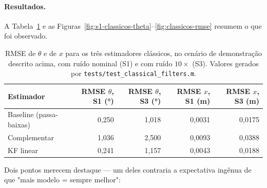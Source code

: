 \documentclass[brazil, 12pt]{article}
\begin{document}
\paragraph{Resultados.} A Tabela~\ref{tab:rmse-classicos} e as
Figuras~\ref{fig:s1-classicos-theta}--\ref{fig:classicos-rmse} resumem o que
foi observado.

\begin{table}[H]
\centering
\small
\begin{tabular}{@{}l r r r r@{}}
\hline
\textbf{Estimador} & \textbf{RMSE $\theta$, S1 (°)} & \textbf{RMSE $\theta$, S3 (°)} & \textbf{RMSE $x$, S1 (m)} & \textbf{RMSE $x$, S3 (m)} \\
\hline
Baseline (passa-baixas) & 0,250 & 1,018 & 0,0031 & 0,0175 \\
Complementar             & 1,036 & 2,500 & 0,0093 & 0,0388 \\
KF linear                & 0,241 & 1,157 & 0,0043 & 0,0188 \\
\hline
\end{tabular}
\caption{RMSE de $\theta$ e de $x$ para os três estimadores clássicos, no
cenário de demonstração descrito acima, com ruído nominal (S1) e com
ruído $10\times$ (S3). Valores gerados por
\texttt{tests/test\_classical\_filters.m}.}
\label{tab:rmse-classicos}
\end{table}

Dois pontos merecem destaque — um deles contraria a expectativa ingênua de que
"mais modelo = sempre melhor":
\end{document}
